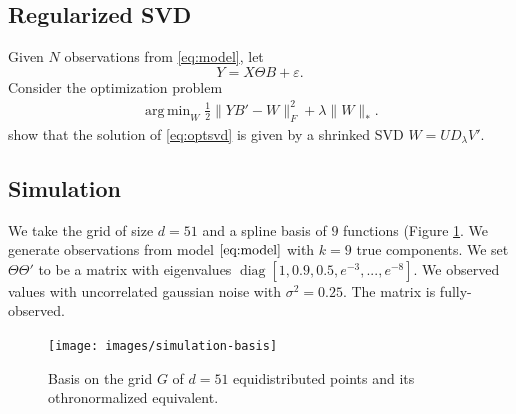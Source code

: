 \documentclass{article}
\DeclareMathOperator*{\argmin}{arg\,min}
\DeclareMathOperator*{\diag}{diag}
\begin{document}
\subsection{Regularized SVD}
Given $N$ observations from \eqref{eq:model}, let
\[
Y =  X\Theta B + \varepsilon.
\]
Consider the optimization problem
\begin{align}\label{eq:optsvd}
\argmin_{W} \frac{1}{2} \| YB' - W \|_F^2 + \lambda\|W\|_*.
\end{align}
\citet{cai2010singular} show that the solution of \eqref{eq:optsvd} is given by a shrinked SVD $W = UD_\lambda V'$.

\subsection{Simulation}

We take the grid of size $d = 51$ and a spline basis of $9$ functions (Figure \ref{fig:basis}. We generate observations from model $\eqref{eq:model}$ with $k = 9$ true components. We set $\Theta\Theta'$ to be a matrix with eigenvalues $\diag[1,0.9,0.5,e^{-3},...,e^{-8}]$. We observed values with uncorrelated gaussian noise with $\sigma^2 = 0.25$. The matrix is fully-observed.

\begin{figure}[h]
  \texttt{[image: images/simulation-basis]}
  \caption{Basis on the grid $G$ of $d=51$ equidistributed points and its othronormalized equivalent.}
  \label{fig:basis}
\end{figure}
\end{document}
